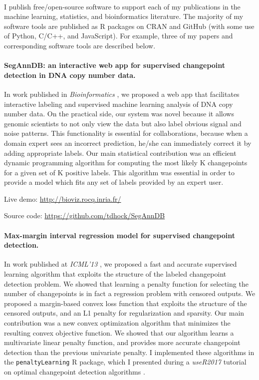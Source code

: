 \documentclass{article}
\begin{document}
\mbox{ }

I publish free/open-source software to support each of my publications
in the machine learning, statistics, and bioinformatics
literature. The majority of my software tools are published as R
packages on CRAN and GitHub (with some use of Python, C/C++, and
JavaScript). For example, three of my papers and corresponding software
tools are described below.

\paragraph{SegAnnDB: an interactive web app for supervised changepoint
  detection in DNA copy number data.} In work published in
\emph{Bioinformatics} \citep{hocking-SegAnnDB}, we proposed a web app
that facilitates interactive labeling and supervised machine learning
analysis of DNA copy number data. On the practical side, our system
was novel because it allows genomic scientists to not only view the
data but also label obvious signal and noise patterns. This
functionality is essential for collaborations, because when a domain
expert sees an incorrect prediction, he/she can immediately correct it
by adding appropriate labels. Our main statistical contribution was an
efficient dynamic programming algorithm for computing the most likely
K changepoints for a given set of K positive labels. This algorithm
was essential in order to provide a model which fits any set of labels
provided by an expert user. 

Live demo: \url{http://bioviz.rocq.inria.fr/}

Source code: \url{https://github.com/tdhock/SegAnnDB}

\paragraph{Max-margin interval regression model for supervised
  changepoint detection.}
In work published at \emph{ICML'13} \citep{HOCKING-penalties}, we
proposed a fast and accurate supervised learning algorithm
that exploits the structure of the labeled changepoint detection
problem. We showed that learning a penalty function for selecting the
number of changepoints is in fact a regression problem with censored
outputs. We proposed a margin-based convex loss function that
exploits the structure of the censored outputs, and an L1 penalty for
regularization and sparsity. Our main contribution was a new convex
optimization algorithm that minimizes the resulting convex objective
function. We showed that our algorithm learns a multivariate linear
penalty function, and provides more accurate changepoint detection
than the previous univariate penalty. I implemented these algorithms
in the \texttt{penaltyLearning} R package, which I presented during a
\emph{useR2017} tutorial on optimal changepoint detection algorithms
\citep{change-tutorial}.
\end{document}
